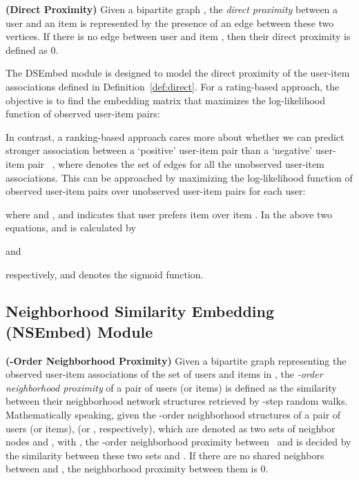 \documentclass[sigconf,anonymous=false]{acmart}
\begin{document}
\begin{definition}{{\bf (Direct Proximity)} \rm
   Given a bipartite graph , the \emph{direct proximity} between
   a user  and an item  is represented by the presence of
   an edge  between these two vertices. If there is no edge
   between user  and item , then their direct proximity is defined as
 0.}
 \label{def:direct}
\end{definition}

The DSEmbed module is designed to model the direct proximity of the user-item
associations defined in Definition~\ref{def:direct}.
For a rating-based approach, the objective is to find the embedding matrix
 that maximizes the log-likelihood function of observed user-item pairs:


In contrast, a ranking-based approach cares more about whether we can predict
stronger association between a `positive' user-item pair  than
a `negative' user-item pair ~\cite{bpr}, where 
denotes the set of edges for all the unobserved user-item associations.
This can be approached by maximizing the log-likelihood function of observed
user-item pairs over unobserved user-item pairs for each user:

where  and , and  indicates that user  prefers
item  over item .
In the above two equations,  and  is calculated by 

and

respectively, and  denotes the sigmoid function.

\subsection{Neighborhood Similarity Embedding (NSEmbed) Module}\label{sec:nsembed}

 \begin{definition}{{\bf (-Order Neighborhood Proximity)} \rm
   Given a bipartite graph  representing the observed user-item
   associations of the set of users and items in , the 
   \emph{-order neighborhood proximity} of a pair of users (or items) is defined
   as the similarity between their neighborhood network structures retrieved by
   -step random walks.  Mathematically speaking, given the -order neighborhood
   structures of a pair of users (or items),  (or ,
   respectively), which are denoted as two sets of neighbor nodes  and ,
   with , the -order neighborhood proximity between~
   and  is decided by the similarity between these two sets  and .
   If there are no shared neighbors between  and , the neighborhood
 proximity between them is 0.}
 \label{def:neighbor}
\end{definition}
\end{document}
